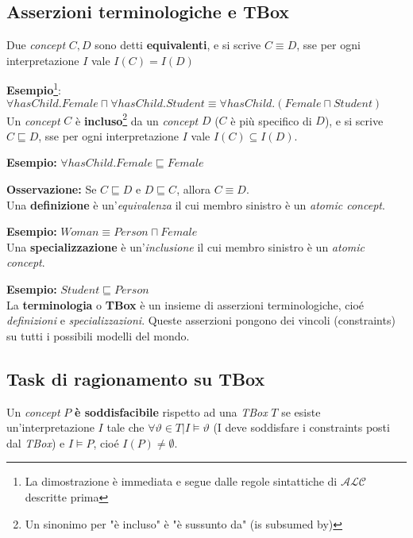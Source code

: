 \subsection{Asserzioni terminologiche e TBox}
Due \textit{concept} $C, D$ sono detti \textbf{equivalenti}, e si scrive $C \equiv D$, sse per ogni interpretazione $I$ vale $I(C) = I(D)$

\textbf{Esempio}\footnote{La dimostrazione è immediata e segue dalle regole sintattiche di $\mathscr{ALC}$ descritte prima}: $\forall hasChild. Female \sqcap \forall hasChild. Student \equiv \forall hasChild . (Female \sqcap Student)$
\\

Un \textit{concept} $C$ è \textbf{incluso}\footnote{Un sinonimo per "è incluso" è "è sussunto da" (is subsumed by)} da un \textit{concept} $D$ ($C$ è più specifico di $D$), e si scrive $C \sqsubseteq D$, sse per ogni interpretazione $I$ vale $I(C) \subseteq I(D)$.

\textbf{Esempio:} $\forall hasChild. Female \sqsubseteq Female$ 

\textbf{Osservazione:} Se $C \sqsubseteq D$ e $D \sqsubseteq C$, allora $C \equiv D$.
\\

Una \textbf{definizione} è un'\textit{equivalenza} il cui membro sinistro è un \textit{atomic concept}.

\textbf{Esempio:} $Woman \equiv Person \sqcap Female$
\\

Una \textbf{specializzazione} è un'\textit{inclusione} il cui membro sinistro è un \textit{atomic concept}.

\textbf{Esempio:} $Student \sqsubseteq Person$
\\

La \textbf{terminologia} o \textbf{TBox} è un insieme di asserzioni terminologiche, cioé \textit{definizioni} e \textit{specializzazioni}. Queste asserzioni pongono dei vincoli (constraints) su tutti i possibili modelli del mondo.

\subsection{Task di ragionamento su TBox}

Un \textit{concept} $P$ \textbf{è soddisfacibile} rispetto ad una \textit{TBox} $T$ se esiste un'interpretazione $I$ tale che $\forall \vartheta \in T | I \models \vartheta$ (I deve soddisfare i constraints posti dal \textit{TBox}) e $I \models P$, cioé $I(P) \neq \emptyset$.

